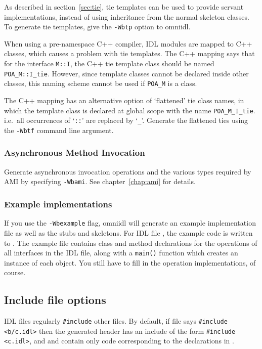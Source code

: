 \documentclass[11pt,oneside,a4paper]{book}
\newcommand{\type}[1]{\texttt{#1}}
\newcommand{\intf}[1]{\texttt{#1}}
\newcommand{\code}[1]{\texttt{#1}}
\newcommand{\op}[1]{\texttt{#1()}}
\newcommand{\cmdline}[1]{\texttt{#1}}
\begin{document}
As described in section~\ref{sec:tie}, tie templates can be used to
provide servant implementations, instead of using inheritance from the
normal skeleton classes. To generate tie templates, give the
\cmdline{-Wbtp} option to omniidl.

When using a pre-namespace C++ compiler, IDL modules are mapped to C++
classes, which causes a problem with tie templates.  The C++ mapping
says that for the interface \intf{M::I}, the C++ tie template class
should be named \type{POA\_M::I\_tie}. However, since template classes
cannot be declared inside other classes, this naming scheme cannot be
used if \type{POA\_M} is a class.

The C++ mapping has an alternative option of `flattened' tie class
names, in which the template class is declared at global scope with
the name \type{POA\_M\_I\_tie}. i.e.\ all occurrences of `\type{::}'
are replaced by `\type{\_}'. Generate the flattened ties using the
\cmdline{-Wbtf} command line argument.


\subsubsection{Asynchronous Method Invocation}

Generate asynchronous invocation operations and the various types
required by AMI by specifying \cmdline{-Wbami}. See
chapter~\ref{chap:ami} for details.


\subsubsection{Example implementations}

If you use the \cmdline{-Wbexample} flag, omniidl will generate an
example implementation file as well as the stubs and skeletons. For
IDL file , the example code is written to
. The example file contains class and method
declarations for the operations of all interfaces in the IDL file,
along with a \op{main} function which creates an instance of each
object. You still have to fill in the operation implementations, of
course.


\subsection{Include file options}

IDL files regularly \code{\#include} other files. By default, if file
 says \code{\#include <b/c.idl>} then the generated
header  has an include of the form \code{\#include
  <c.idl>}, and  and  contain only code
corresponding to the declarations in .
\end{document}

